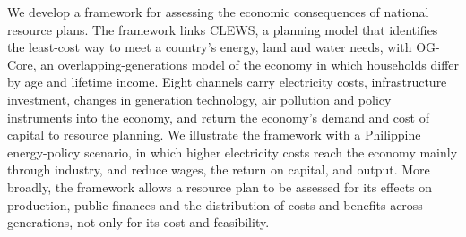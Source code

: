 We develop a framework for assessing the economic consequences of national resource
plans. The framework links CLEWS, a planning model that identifies the least-cost way to
meet a country's energy, land and water needs, with OG-Core, an overlapping-generations
model of the economy in which households differ by age and lifetime income. Eight channels
carry electricity costs, infrastructure investment, changes in generation technology, air
pollution and policy instruments into the economy, and return the economy's demand and
cost of capital to resource planning. We illustrate the framework with a Philippine energy-policy
scenario, in which higher electricity costs reach the economy mainly through industry,
and reduce wages, the return on capital, and output. More broadly, the framework allows a resource plan to be assessed for its effects
on production, public finances and the distribution of costs and benefits across
generations, not only for its cost and feasibility.
